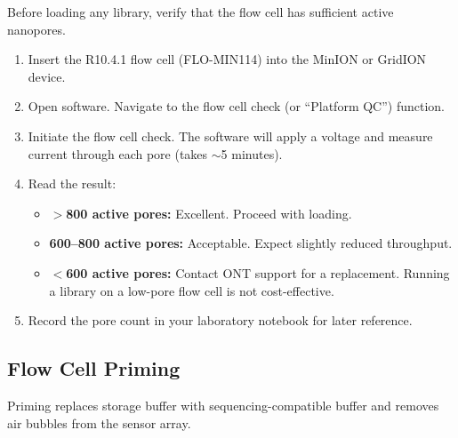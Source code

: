 Before loading any library, verify that the flow cell has sufficient active nanopores.

\begin{protocolbox}[title={Protocol: Flow Cell Quality Check}]
\begin{enumerate}[nosep]
  \item Insert the R10.4.1 flow cell (FLO-MIN114) into the MinION or GridION device.
  \item Open  software. Navigate to the flow cell check (or ``Platform QC'') function.
  \item Initiate the flow cell check. The software will apply a voltage and measure current through each pore (takes $\sim$5 minutes).
  \item Read the result:
    \begin{itemize}[nosep]
      \item \textbf{$>$800 active pores:} Excellent. Proceed with loading.
      \item \textbf{600--800 active pores:} Acceptable. Expect slightly reduced throughput.
      \item \textbf{$<$600 active pores:} Contact \acrshort{ONT} support for a replacement. Running a library on a low-pore flow cell is not cost-effective.
    \end{itemize}
  \item Record the pore count in your laboratory notebook for later reference.
\end{enumerate}
\end{protocolbox}

\subsection{Flow Cell Priming}
\label{subsec:protocols:priming}

Priming replaces storage buffer with sequencing-compatible buffer and removes air bubbles from the sensor array.

